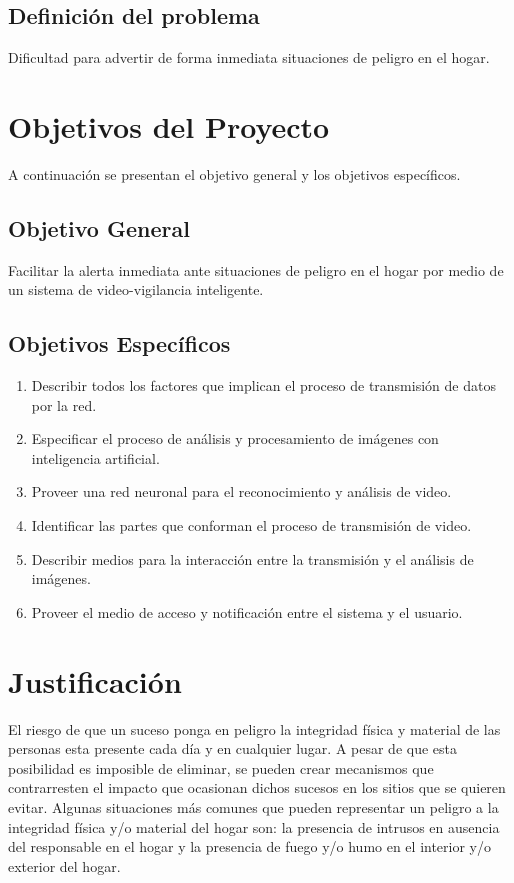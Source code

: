 \subsection{Definición del problema}
Dificultad para advertir de forma inmediata situaciones de peligro en el hogar.\\

\section{Objetivos del Proyecto}
A continuación se presentan el objetivo general y los objetivos específicos.\\

\subsection{Objetivo General}
Facilitar la alerta inmediata ante situaciones de peligro en el hogar por medio de un sistema de video-vigilancia inteligente.\\

\subsection{Objetivos Específicos}
\begin{enumerate}
    \item Describir todos los factores que implican el proceso de transmisión de datos por la red.
    \item Especificar el proceso de análisis y procesamiento de imágenes con inteligencia artificial.
    \item Proveer una red neuronal para el reconocimiento y análisis de video.
    \item Identificar las partes que conforman el proceso de transmisión de video.
    \item Describir medios para la interacción entre la transmisión y el análisis de imágenes.
    \item Proveer el medio de acceso y notificación entre el sistema y el usuario.
\end{enumerate}

\section{Justificación}
El riesgo de que un suceso ponga en peligro la integridad física y material de las personas esta presente cada día y en cualquier lugar. A pesar de que esta posibilidad es imposible de eliminar, se pueden crear mecanismos que contrarresten el impacto que ocasionan dichos sucesos en los sitios que se quieren evitar. Algunas situaciones más comunes que pueden representar un peligro a la integridad física y/o material del hogar son: la presencia de intrusos en ausencia del responsable en el hogar y la presencia de fuego y/o humo en el interior y/o exterior del hogar.\\

